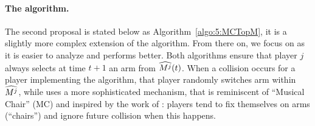 \paragraph{The \MCTopM{} algorithm.}
%
The second proposal \MCTopM{} is stated below as Algorithm~\ref{algo:5:MCTopM},
it is a slightly more complex extension of the \RandTopM{} algorithm.
From there on, we focus on \MCTopM{} as it is easier to analyze and performs better.
%
Both algorithms ensure that player $j$ always
selects at time $t+1$ an arm from $\widehat{M^j}(t)$.
When a collision occurs for a player implementing the \RandTopM{} algorithm, that player randomly switches arm within $\widehat{M^j}$, while \MCTopM{} uses a more sophisticated mechanism, that is reminiscent of ``Musical Chair'' (MC) and inspired by the work of \cite{Rosenski16}: players tend to fix themselves on arms (``chairs'') and ignore future collision when this happens.



